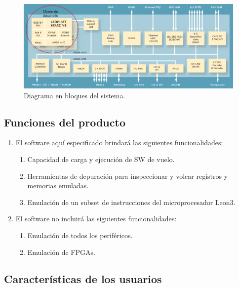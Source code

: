 \documentclass[
  11pt, %
  codirector, %
]{charter}
\begin{document}
\begin{figure}[htpb]
  \label{fig:Components}
  \centering
  \includegraphics[width=1\textwidth]{./Figuras/Components.png}
  \caption{Diagrama en bloques del sistema.}
\end{figure}

\vspace{25px}


\subsection{Funciones del producto}
\label{sec:orgaf51da6}

\begin{enumerate}
\item El software aquí especificado brindará las siguientes funcionalidades:
  \begin{enumerate}
  \item Capacidad de carga y ejecución de SW de vuelo.
  \item Herramientas de depuración para inspeccionar y volcar registros y memorias emuladas.
  \item Emulación de un subset de instrucciones del microprocesador Leon3.
  \end{enumerate}
\item El software no incluirá las siguientes funcionalidades:
  \begin{enumerate}
  \item Emulación de todos los periféricos.
  \item Emulación de FPGAs.
  \end{enumerate}

\end{enumerate}



\subsection{Características de los usuarios}
\label{sec:orga40b0ee}
\end{document}
